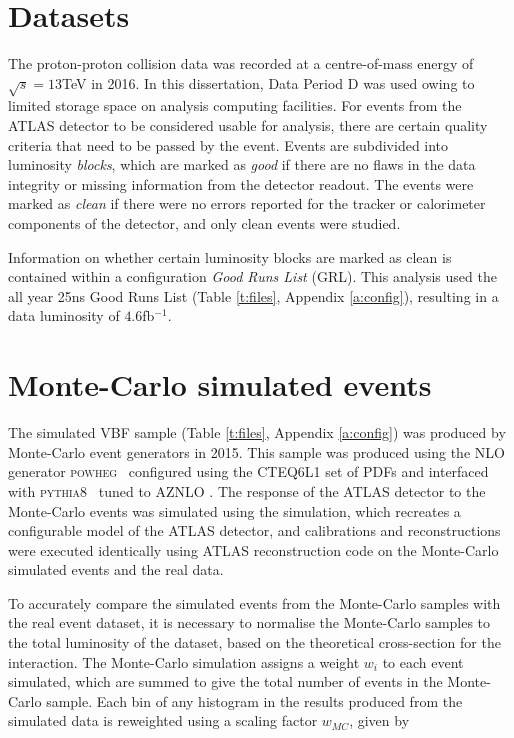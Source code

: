 	\section{Datasets}

	The proton-proton collision data was recorded at a centre-of-mass energy of $\sqrt{s}=13$TeV in 2016. In this dissertation, Data Period D was used owing to limited storage space on analysis computing facilities. For events from the ATLAS detector to be considered usable for analysis, there are certain quality criteria that need to be passed by the event. Events are subdivided into luminosity \textit{blocks}, which are marked as \textit{good} if there are no flaws in the data integrity or missing information from the detector readout. The events were marked as \textit{clean} if there were no errors reported for the tracker or calorimeter components of the detector, and only clean events were studied.

	Information on whether certain luminosity blocks are marked as clean is contained within a configuration \textit{Good Runs List} (GRL). This analysis used the all year 25ns Good Runs List (Table \ref{t:files}, Appendix \ref{a:config}), resulting in a data luminosity of $4.6$fb$^{-1}$.

	\section{Monte-Carlo simulated events}

		 The simulated VBF sample (Table \ref{t:files}, Appendix \ref{a:config}) was produced by Monte-Carlo event generators in 2015. This sample was produced using the NLO generator \textsc{powheg}~\cite{powheg} configured using the CTEQ6L1 \cite{CTEQ} set of PDFs and interfaced with \textsc{pythia8}~\cite{pythia} tuned to AZNLO \cite{AZNLO}. The response of the ATLAS detector to the Monte-Carlo events was simulated using the  \cite{geant4, geant4atlas} simulation, which recreates a configurable model of the ATLAS detector, and calibrations and reconstructions were executed identically using ATLAS reconstruction code on the Monte-Carlo simulated events and the real  data.

		 To accurately compare the simulated events from the Monte-Carlo samples with the real event dataset, it is necessary to normalise the Monte-Carlo samples to the total luminosity of the dataset, based on the theoretical cross-section for the interaction. The Monte-Carlo simulation assigns a weight $w_i$ to each event simulated, which are summed to give the total number of events in the Monte-Carlo sample. Each bin of any histogram in the results produced from the simulated data is reweighted using a scaling factor $w_{MC}$, given by

